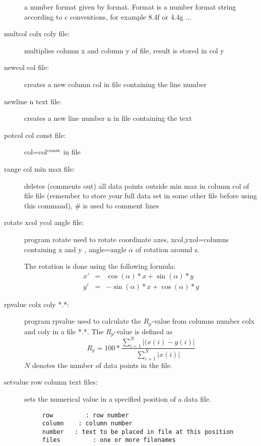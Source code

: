 \begin{description}
             a number format given by format. Format is a number format string according
             to c conventions, for example 8.4f or 4.4g  ...             
\item [\prg multcol\index{multcol}  colx coly file:] multiplies column x and column y of file, %
result is stored in col y
\item [\prg newcol\index{newcol} col file:] creates a new column col in file containing the line %
number
\item [\prg newline\index{newcol} n text file:] creates a new line number n  in file containing %
the text 
\item [\prg potcol\index{potcol} col const file:]  col=col$^{\rm const}$ in file
\item [\prg range\index{range} col min max file:] deletes (comments out) all data points outside %
min max in column  col of
                       file file (remember to store your full data set in some other
		       file before using this command), \# is used to comment lines
\item[\prg rotate\index{rotate} xcol ycol angle file:]
program rotate  used to rotate coordinate axes,
 xcol,yxol=columns containing x and y , 
 angle=angle $\alpha$ of rotation around z.
 
 The rotation is done using the following formula:
\begin{eqnarray}
 x'&= &\cos(\alpha)*x+\sin(\alpha)*y \nonumber \\
 y'&=&-\sin(\alpha)*x+\cos(\alpha)*y
\end{eqnarray}
\item [\prg rpvalue\index{rpvalue} colx coly  *.*:]  program rpvalue  used to %
calculate 
                       the $R_p$-value from columns number colx and coly 
		       in a file *.*. The $R_p$-value is defined as
		       \begin{equation}
		       R_p= 100*\frac{\sum_{i=1}^{N} |(x(i)-y(i)|}{\sum_{i=1}^{N}|x(i)|}
		       \end{equation}
                       $N$ denotes the number of data points in the file.
\item [\prg setvalue\index{setvalue} row column text files:] sets the numerical value in a specified position of a data file.

\begin{verbatim}
     row         : row number
     column    : column number
     number   : text to be placed in file at this position
     files         : one or more filenames


\end{verbatim}
\end{description}
